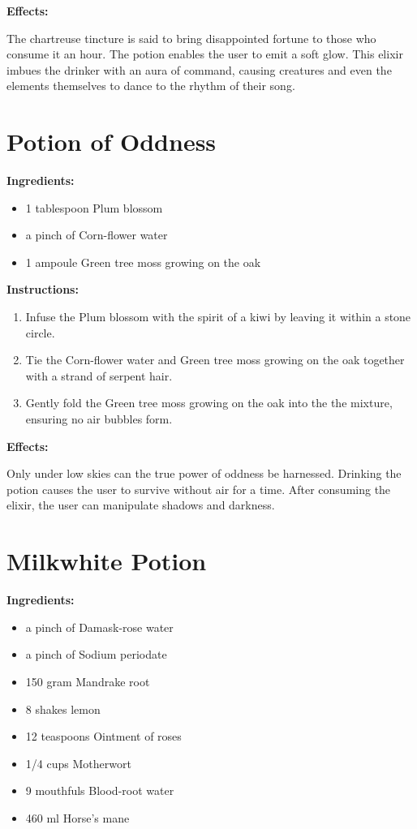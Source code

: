 \documentclass{article}
\begin{document}
\textbf{Effects:}

The chartreuse tincture is said to bring disappointed fortune to those who consume it an hour. The potion enables the user to emit a soft glow. This elixir imbues the drinker with an aura of command, causing creatures and even the elements themselves to dance to the rhythm of their song.

\newpage
\section*{Potion of Oddness}

\textbf{Ingredients:}

\begin{itemize}
  \item 1 tablespoon Plum blossom
  \item a pinch of Corn-flower water
  \item 1 ampoule Green tree moss growing on the oak
\end{itemize}

\textbf{Instructions:}

\begin{enumerate}
  \item Infuse the Plum blossom with the spirit of a kiwi by leaving it within a stone circle.
  \item Tie the Corn-flower water and Green tree moss growing on the oak together with a strand of serpent hair.
  \item Gently fold the Green tree moss growing on the oak into the the mixture, ensuring no air bubbles form.
\end{enumerate}

\textbf{Effects:}

Only under low skies can the true power of oddness be harnessed. Drinking the potion causes the user to survive without air for a time. After consuming the elixir, the user can manipulate shadows and darkness.

\newpage
\section*{Milkwhite Potion}

\textbf{Ingredients:}

\begin{itemize}
  \item a pinch of Damask-rose water
  \item a pinch of Sodium periodate
  \item 150 gram Mandrake root
  \item 8 shakes lemon
  \item 12 teaspoons Ointment of roses
  \item 1/4 cups Motherwort
  \item 9 mouthfuls Blood-root water
  \item 460 ml Horse's mane
\end{itemize}
\end{document}

